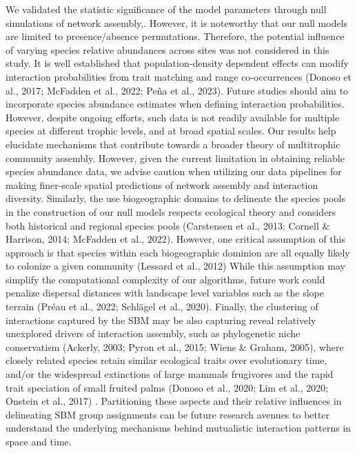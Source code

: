 \documentclass[
]{agujournal2019}
\begin{document}
We validated the statistic significance of the model parameters through
null simulations of network assembly,. However, it is noteworthy that
our null models are limited to presence/absence permutations. Therefore,
the potential influence of varying species relative abundances across
sites was not considered in this study. It is well established that
population-density dependent effects can modify interaction
probabilities from trait matching and range co-occurrences (Donoso et
al., 2017; McFadden et al., 2022; Peña et al., 2023). Future studies
should aim to incorporate species abundance estimates when defining
interaction probabilities. However, despite ongoing efforts, such data
is not readily available for multiple species at different trophic
levels, and at broad spatial scales. Our results help elucidate
mechanisms that contribute towards a broader theory of multitrophic
community assembly. However, given the current limitation in obtaining
reliable species abundance data, we advise caution when utilizing our
data pipelines for making finer-scale spatial predictions of network
assembly and interaction diversity. Similarly, the use biogeographic
domains to delineate the species pools in the construction of our null
models respects ecological theory and considers both historical and
regional species pools (Carstensen et al., 2013; Cornell \& Harrison,
2014; McFadden et al., 2022). However, one critical assumption of this
approach is that species within each biogeographic dominion are all
equally likely to colonize a given community (Lessard et al., 2012)
While this assumption may simplify the computational complexity of our
algorithms, future work could penalize dispersal distances with
landscape level variables such as the slope terrain (Préau et al., 2022;
Schlägel et al., 2020). Finally, the clustering of interactions captured
by the SBM may be also capturing reveal relatively unexplored drivers of
interaction assembly, such as phylogenetic niche conservatism (Ackerly,
2003; Pyron et al., 2015; Wiens \& Graham, 2005), where closely related
species retain similar ecological traits over evolutionary time, and/or
the widespread extinctions of large mammals frugivores and the rapid
trait speciation of small fruited palms (Donoso et al., 2020; Lim et
al., 2020; Onstein et al., 2017) . Partitioning these aspects and their
relative influences in delineating SBM group assignments can be future
research avenues to better understand the underlying mechanisms behind
mutualistic interaction patterns in space and time.
\end{document}
